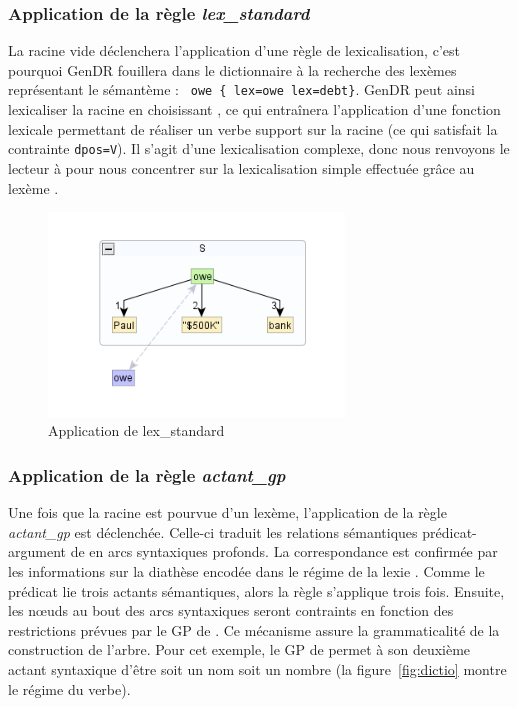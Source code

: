 \subsubsection{Application de la règle \emph{lex\_standard}}
La racine vide déclenchera l'application d'une règle de lexicalisation, c'est pourquoi GenDR fouillera dans le dictionnaire à la recherche des lexèmes représentant le sémantème : \lstinline! owe { lex=owe lex=debt}!. GenDR peut ainsi lexicaliser la racine en choisissant , ce qui entraînera l'application d'une fonction lexicale permettant de réaliser un verbe support sur la racine (ce qui satisfait la contrainte \texttt{dpos=V}). Il s'agit d'une lexicalisation complexe, donc nous renvoyons le lecteur à \cite{lambrey15,LambreyImplementationcollocationspour2017,lareau18} pour nous concentrer sur la lexicalisation simple effectuée grâce au lexème .

\begin{figure}[htb]
	\centering
	\includegraphics[width=0.7\textwidth, trim = {0cm 0.7cm 0cm 0.9cm},clip]{ch3/figs/lex_standard_root.png}
		\vspace{-0.5cm}
	\caption{Application de lex\_standard}
	\label{fig:lexstand1}
\end{figure}

\subsubsection{Application de la règle \emph{actant\_gp}}
Une fois que la racine est pourvue d'un lexème, l'application de la règle \emph{actant\_gp} est déclenchée. Celle-ci traduit les relations sémantiques prédicat-argument de  en arcs syntaxiques profonds. La correspondance est confirmée par les informations sur la diathèse encodée dans le régime de la lexie . Comme le prédicat lie trois actants sémantiques, alors la règle s'applique trois fois. Ensuite, les n\oe{}uds au bout des arcs syntaxiques seront contraints en fonction des restrictions prévues par le \ac{GP} de . Ce mécanisme assure la grammaticalité de la construction de l'arbre. Pour cet exemple, le \ac{GP} de  permet à son deuxième actant syntaxique d'être soit un nom soit un nombre (la figure~\ref{fig:dictio} montre le régime du verbe).

